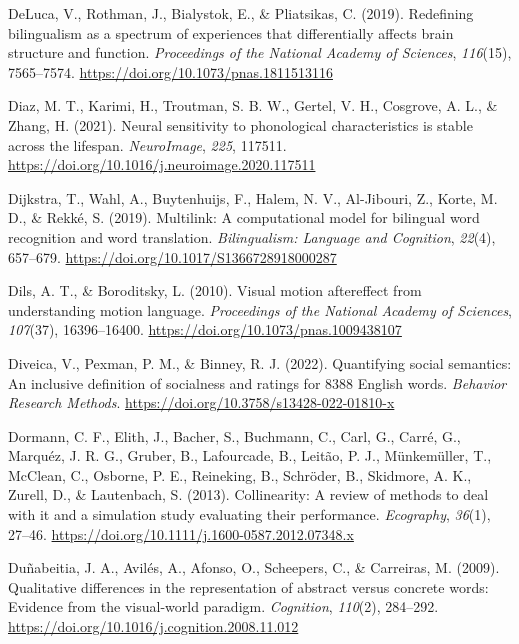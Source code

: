 \documentclass[
  12pt,
  man,floatsintext]{apa7}
\newlength{\cslhangindent}
\newlength{\cslentryspacingunit} %
\newenvironment{CSLReferences}[2] %
 {%
  \setlength{\parindent}{0pt}
  \ifodd #1
  \let\oldpar\par
  \def\par{\hangindent=\cslhangindent\oldpar}
  \fi
  \setlength{\parskip}{#2\cslentryspacingunit}
 }%
 {}
\begin{document}
\begin{CSLReferences}{1}{0}
\leavevmode{}%
DeLuca, V., Rothman, J., Bialystok, E., \& Pliatsikas, C. (2019). Redefining bilingualism as a spectrum of experiences that differentially affects brain structure and function. \emph{Proceedings of the National Academy of Sciences}, \emph{116}(15), 7565--7574. \url{https://doi.org/10.1073/pnas.1811513116}

\leavevmode{}%
Diaz, M. T., Karimi, H., Troutman, S. B. W., Gertel, V. H., Cosgrove, A. L., \& Zhang, H. (2021). Neural sensitivity to phonological characteristics is stable across the lifespan. \emph{NeuroImage}, \emph{225}, 117511. \url{https://doi.org/10.1016/j.neuroimage.2020.117511}

\leavevmode{}%
Dijkstra, T., Wahl, A., Buytenhuijs, F., Halem, N. V., Al-Jibouri, Z., Korte, M. D., \& Rekké, S. (2019). Multilink: {A} computational model for bilingual word recognition and word translation. \emph{Bilingualism: Language and Cognition}, \emph{22}(4), 657--679. \url{https://doi.org/10.1017/S1366728918000287}

\leavevmode{}%
Dils, A. T., \& Boroditsky, L. (2010). Visual motion aftereffect from understanding motion language. \emph{Proceedings of the National Academy of Sciences}, \emph{107}(37), 16396--16400. \url{https://doi.org/10.1073/pnas.1009438107}

\leavevmode{}%
Diveica, V., Pexman, P. M., \& Binney, R. J. (2022). Quantifying social semantics: {An} inclusive definition of socialness and ratings for 8388 {English} words. \emph{Behavior Research Methods}. \url{https://doi.org/10.3758/s13428-022-01810-x}

\leavevmode{}%
Dormann, C. F., Elith, J., Bacher, S., Buchmann, C., Carl, G., Carré, G., Marquéz, J. R. G., Gruber, B., Lafourcade, B., Leitão, P. J., Münkemüller, T., McClean, C., Osborne, P. E., Reineking, B., Schröder, B., Skidmore, A. K., Zurell, D., \& Lautenbach, S. (2013). Collinearity: A review of methods to deal with it and a simulation study evaluating their performance. \emph{Ecography}, \emph{36}(1), 27--46. \url{https://doi.org/10.1111/j.1600-0587.2012.07348.x}

\leavevmode{}%
Duñabeitia, J. A., Avilés, A., Afonso, O., Scheepers, C., \& Carreiras, M. (2009). Qualitative differences in the representation of abstract versus concrete words: {Evidence} from the visual-world paradigm. \emph{Cognition}, \emph{110}(2), 284--292. \url{https://doi.org/10.1016/j.cognition.2008.11.012}


\end{CSLReferences}
\end{document}
